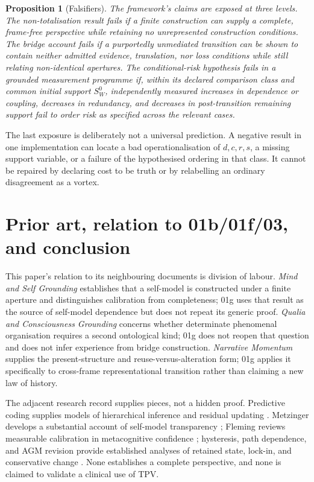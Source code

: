 \documentclass[11pt,a4paper]{article}
\newtheorem{proposition}[definition]{Proposition}
\theoremstyle{remark}
\begin{document}
\begin{proposition}[Falsifiers]\label{prop:falsifiers}
The framework's claims are exposed at three levels. The non-totalisation result
fails if a finite construction can supply a complete, frame-free perspective
while retaining no unrepresented construction conditions. The bridge account
fails if a purportedly unmediated transition can be shown to contain neither
admitted evidence, translation, nor loss conditions while still relating
non-identical apertures. The conditional-risk hypothesis fails in a grounded measurement programme if,
within its declared comparison class and common initial support $S_W^0$,
independently measured increases in dependence or coupling, decreases in
redundancy, and decreases in post-transition remaining support fail to order
risk as specified across the relevant cases.
\end{proposition}

The last exposure is deliberately not a universal prediction. A negative result
in one implementation can locate a bad operationalisation of $d,c,r,s$, a
missing support variable, or a failure of the hypothesised ordering in that
class. It cannot be repaired by declaring cost to be truth or by relabelling an
ordinary disagreement as a vortex.

\section{Prior art, relation to 01b/01f/03, and conclusion}\label{sec:conclusion}
This paper's relation to its neighbouring documents is division of labour.
\emph{Mind and Self Grounding} establishes that a self-model is constructed
under a finite aperture and distinguishes calibration from completeness; 01g
uses that result as the source of self-model dependence but does not repeat its
generic proof. \emph{Qualia and Consciousness Grounding} concerns whether
determinate phenomenal organisation requires a second ontological kind; 01g
does not reopen that question and does not infer experience from bridge
construction. \emph{Narrative Momentum} supplies the present-structure and
reuse-versus-alteration form; 01g applies it specifically to cross-frame
representational transition rather than claiming a new law of history.

The adjacent research record supplies pieces, not a hidden proof. Predictive
coding supplies models of hierarchical inference and residual updating
\citep{raoballard1999,friston2010}. Metzinger develops a substantial account of
self-model transparency \citep{metzinger2003,metzinger2020}; Fleming reviews
measurable calibration in metacognitive confidence \citep{fleming2024};
hysteresis, path dependence, and AGM revision provide established analyses of
retained state, lock-in, and conservative change
\citep{mayergoyz1991,mayergoyz2003,arthur1989,david1985,pierson2000,agm1985}.
None establishes a complete perspective, and none is claimed to validate a
clinical use of TPV.
\end{document}
